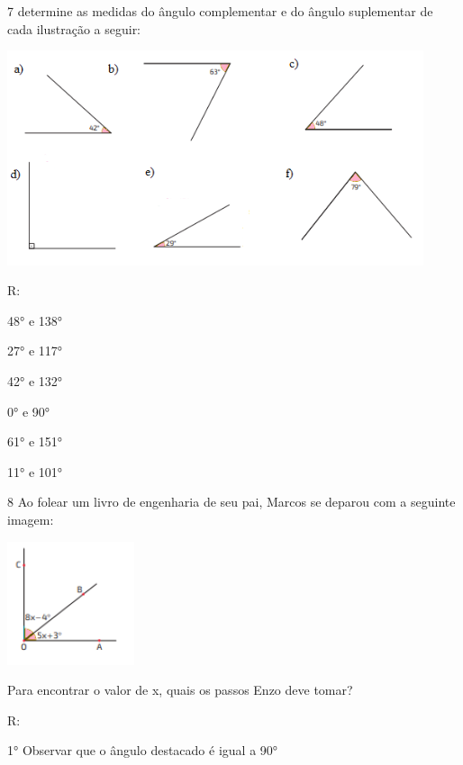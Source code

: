 {

\num{7} determine as medidas do ângulo complementar e do ângulo suplementar
de cada ilustração a seguir:

\includegraphics[width=4.81667in,height=2.48373in]{./imgSAEB_8_MAT/media/image30.png}

R:
\item 48° e 138°
\item 27° e 117°
\item 42° e 132°
\item 0° e 90°
\item 61° e 151°
\item 11° e 101°

\num{8} Ao folear um livro de engenharia de seu pai, Marcos se deparou com a
seguinte imagem:

\includegraphics[width=1.47134in,height=1.42708in]{./imgSAEB_8_MAT/media/image31.png}

Para encontrar o valor de x, quais os passos Enzo deve tomar?

R:

1° Observar que o ângulo destacado é igual a 90°

}
